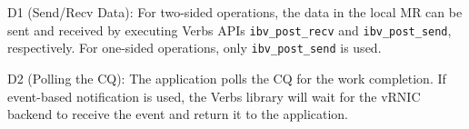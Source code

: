 
D1 (Send/Recv Data): For two-sided operations, the data in the local MR can be sent and received by executing Verbs APIs \texttt{ibv\_post\_recv} and \texttt{ibv\_post\_send}, respectively. For one-sided operations, only \texttt{ibv\_post\_send} is used.


D2 (Polling the CQ): The application polls the CQ for the work completion. If event-based notification is used, the Verbs library will wait for the vRNIC backend to receive the event and return it to the application.
